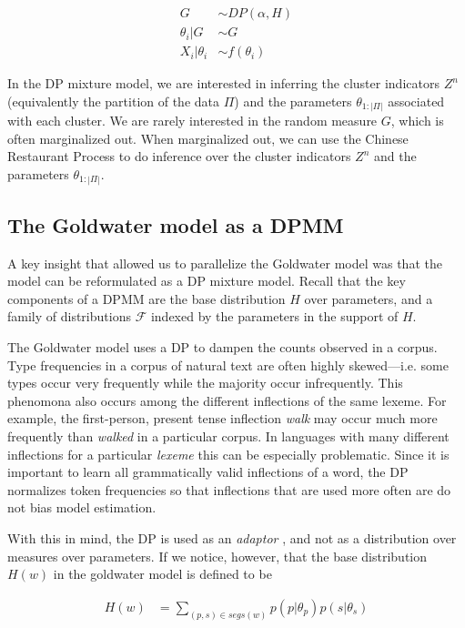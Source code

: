 \begin{align}
  G &\sim DP(\alpha, H) \\ \theta_i|G &\sim G \\ X_i|\theta_i &\sim f(\theta_i)
\end{align}

In the DP mixture model, we are interested in inferring the cluster
indicators $Z^n$ (equivalently the partition of the data $\Pi$) and
the parameters $\theta_{1:|\Pi|}$ associated with each cluster. We are
rarely interested in the random measure $G$, which is often
marginalized out. When marginalized out, we can use the Chinese
Restaurant Process to do inference over the cluster indicators $Z^n$
and the parameters $\theta_{1:|\Pi|}$.

\subsection{The Goldwater model as a DPMM}

A key insight that allowed us to parallelize the Goldwater model was
that the model can be reformulated as a DP mixture model. Recall that
the key components of a DPMM are the base distribution $H$ over
parameters, and a family of distributions $\mathcal{F}$ indexed by the
parameters in the support of $H$.

The Goldwater model uses a DP to dampen the counts observed in a
corpus. Type frequencies in a corpus of natural text are often highly
skewed---i.e. some types occur very frequently while the majority
occur infrequently. This phenomona also occurs among the different
inflections of the same lexeme. For example, the first-person, present
tense inflection \textit{walk} may occur much more frequently than
\textit{walked} in a particular corpus. In languages with many
different inflections for a particular \textit{lexeme} this can be
especially problematic. Since it is important to learn all
grammatically valid inflections of a word, the DP normalizes token
frequencies so that inflections that are used more often are do not
bias model estimation.

With this in mind, the DP is used as an \textit{adaptor}
\cite{goldwater2011}, and not as a distribution over measures over
parameters. If we notice, however, that the base distribution $H(w)$
in the goldwater model is defined to be

\begin{align*}
  H(w) &= \sum_{(p,s) \in segs(w)} p(p | \theta_p) p(s | \theta_s)
\end{align*}

